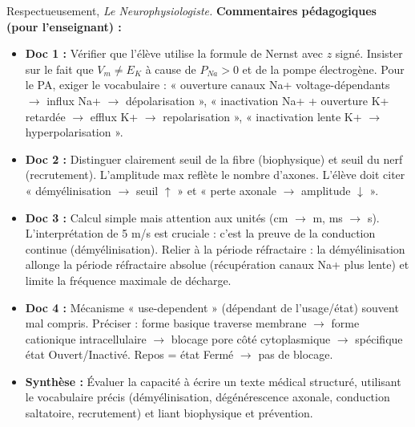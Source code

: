 \documentclass[11pt]{article}
\begin{document}
\begin{exoresolu}
Respectueusement, \textit{Le Neurophysiologiste.}
\tcblower
\textbf{Commentaires pédagogiques (pour l'enseignant) :}
\begin{itemize}
    \item \textbf{Doc 1 :} Vérifier que l'élève utilise la formule de Nernst avec $z$ signé. Insister sur le fait que $V_m \neq E_K$ à cause de $P_{Na} > 0$ et de la pompe électrogène. Pour le PA, exiger le vocabulaire : « ouverture canaux Na+ voltage-dépendants $\to$ influx Na+ $\to$ dépolarisation », « inactivation Na+ + ouverture K+ retardée $\to$ efflux K+ $\to$ repolarisation », « inactivation lente K+ $\to$ hyperpolarisation ».
    \item \textbf{Doc 2 :} Distinguer clairement seuil de la fibre (biophysique) et seuil du nerf (recrutement). L'amplitude max reflète le nombre d'axones. L'élève doit citer « démyélinisation $\to$ seuil $\uparrow$ » et « perte axonale $\to$ amplitude $\downarrow$ ».
    \item \textbf{Doc 3 :} Calcul simple mais attention aux unités (cm $\to$ m, ms $\to$ s). L'interprétation de 5 m/s est cruciale : c'est la preuve de la conduction continue (démyélinisation). Relier à la période réfractaire : la démyélinisation allonge la période réfractaire absolue (récupération canaux Na+ plus lente) et limite la fréquence maximale de décharge.
    \item \textbf{Doc 4 :} Mécanisme « use-dependent » (dépendant de l'usage/état) souvent mal compris. Préciser : forme basique traverse membrane $\to$ forme cationique intracellulaire $\to$ blocage pore côté cytoplasmique $\to$ spécifique état Ouvert/Inactivé. Repos = état Fermé $\to$ pas de blocage.
    \item \textbf{Synthèse :} Évaluer la capacité à écrire un texte médical structuré, utilisant le vocabulaire précis (démyélinisation, dégénérescence axonale, conduction saltatoire, recrutement) et liant biophysique et prévention.
\end{itemize}
\end{exoresolu}
\end{document}
